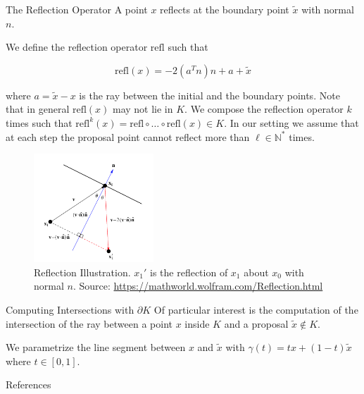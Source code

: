 \documentclass{beamer}
\begin{document}
\begin{frame}[allowframebreaks]{The Reflection Operator}
    A point $x$ reflects at the boundary point $\tilde x$ with normal $n$.
    
    \medskip
    
    We define the reflection operator $\textrm{refl}$ such that 
    
    $$
    \textrm{refl}(x) = - 2 (a^T n) n + a + \tilde x
    $$

    where $a = \tilde x - x$ is the ray between the initial and the boundary points. Note that in general $\textrm{refl}(x)$ may not lie in $K$. We compose the reflection operator $k$ times such that $\textrm{refl}^k (x) = \mathrm {refl} \circ \dots \circ \mathrm{refl} (x) \in K$. In our setting we assume that at each step the proposal point cannot reflect more than $\ell \in \mathbb N^*$ times.

    \framebreak 
    
    \begin{figure}
        \centering
        \includegraphics[width=0.4\textwidth]{publications/presentations/log_concave_sampling/reflection_w.png}
        \caption{Reflection Illustration. $x_1'$ is the reflection of $x_1$ about $x_0$ with normal $n$. Source: \url{https://mathworld.wolfram.com/Reflection.html}}
        \label{fig:my_label}
    \end{figure}
    
\end{frame}


\begin{frame}[allowframebreaks]{Computing Intersections with $\partial K$}
    Of particular interest is the computation of the intersection of the ray between a point $x$ inside $K$ and a proposal $\tilde x \not \in K$. 
    
    \medskip
    
    We parametrize the line segment between $x$ and $\tilde x$ with $\gamma(t) = t x + (1 - t) \tilde x$ where $t \in [0, 1]$. 


    
\end{frame}



\begin{frame}[allowframebreaks]{References}
    \small {

    
    
    
    }
\end{frame}
\end{document}
